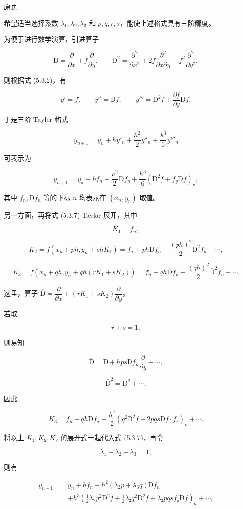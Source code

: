 \documentclass[
  10pt,
  fontset=fandol]{ctexart}
\begin{document}
\href{../../source-images/pdf-130.jpeg}{原页}

希望适当选择系数 \(\lambda_1,\lambda_2,\lambda_3\) 和 \(p,q,r,s\)，能使上述格式具有三阶精度。

为便于进行数学演算，引进算子

\[
\mathrm D=\frac{\partial}{\partial x}+f\frac{\partial}{\partial y},\qquad
\mathrm D^2=\frac{\partial^2}{\partial x^2}+2f\frac{\partial^2}{\partial x\partial y}+f^2\frac{\partial^2}{\partial y^2},
\]

则根据式 (5.3.2)，有

\[
y'=f,\qquad y''=\mathrm Df,\qquad y'''=\mathrm D^2f+\frac{\partial f}{\partial y}\mathrm Df,
\]

于是三阶 Taylor 格式

\[
y_{n+1}=y_n+hy'_n+\frac{h^2}{2}y''_n+\frac{h^3}{6}y'''_n
\]

可表示为

\[
y_{n+1}=y_n+hf_n+\frac{h^2}{2}\mathrm Df_n+\frac{h^3}{6}(\mathrm D^2f+f_y\mathrm Df)_n,\tag{5.3.8}
\]

其中 \(f_n,\mathrm Df_n\) 等的下标 \(n\) 均表示在 \((x_n,y_n)\) 取值。

另一方面，再将式 (5.3.7) Taylor 展开，其中

\[
K_1=f_n,
\]

\[
K_2=f(x_n+ph,y_n+phK_1)=f_n+ph\mathrm Df_n+\frac{(ph)^2}{2}\mathrm D^2f_n+\cdots,
\]

\[
K_3=f(x_n+qh,y_n+qh(rK_1+sK_2))=f_n+qh\overline{\mathrm D}f_n+\frac{(qh)^2}{2}\overline{\mathrm D}^{2}f_n+\cdots.
\]

这里，算子 \(\overline{\mathrm D}=\dfrac{\partial}{\partial x}+(rK_1+sK_2)\dfrac{\partial}{\partial y}\)。

若取

\[
r+s=1,\tag{5.3.9}
\]

则易知

\[
\overline{\mathrm D}=\mathrm D+hps\mathrm Df_n\frac{\partial}{\partial y}+\cdots,\tag{5.3.10}
\]

\[
\overline{\mathrm D}^{2}=\mathrm D^2+\cdots,
\]

因此

\[
K_3=f_n+qh\mathrm Df_n+\frac{h^2}{2}(q^2\mathrm D^2f+2pqs\mathrm Df\cdot f_y)_n+\cdots.
\]

将以上 \(K_1,K_2,K_3\) 的展开式一起代入式 (5.3.7)，再令

\[
\lambda_1+\lambda_2+\lambda_3=1,\tag{5.3.11}
\]

则有

\[
\begin{aligned}
y_{n+1}={}&y_n+hf_n+h^2(\lambda_2p+\lambda_3q)\mathrm Df_n\\
&+h^3\left(\frac12\lambda_2p^2\mathrm D^2f+\frac12\lambda_3q^2\mathrm D^2f+\lambda_3pqsf_y\mathrm Df\right)_n+\cdots,
\end{aligned}
\]
\end{document}

